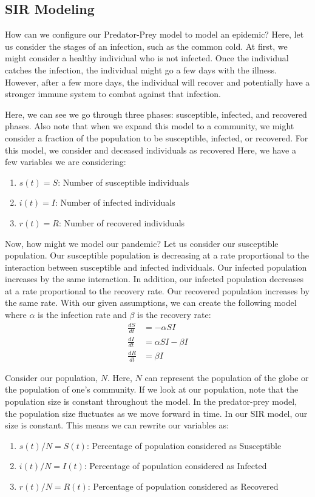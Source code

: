 \documentclass{amsart}
\theoremstyle{definition}
\numberwithin{equation}{section}
\newcommand{\dS}{\frac{dS}{dt}}
\newcommand{\dI}{\frac{dI}{dt}}
\newcommand{\dR}{\frac{dR}{dt}}
\begin{document}
\begin{sansmath}
\section{SIR Modeling}

How can we configure our Predator-Prey model to model an epidemic? Here, let us consider the stages of an infection, such as the common cold. At first, we might consider a healthy individual who is not infected. Once the individual catches the infection, the individual might go a few days with the illness. However, after a few more days, the individual will recover and potentially have a stronger immune system to combat against that infection.

Here, we can see we go through three phases: susceptible, infected, and recovered phases. Also note that when we expand this model to a community, we might consider a fraction of the population to be susceptible, infected, or recovered. For this model, we consider and deceased individuals as recovered Here, we have a few variables we are considering:

\begin{enumerate}
  \item $s(t) = S$: Number of susceptible individuals
  \item $i(t) = I$: Number of infected individuals
  \item $r(t) = R$: Number of recovered individuals
\end{enumerate}

Now, how might we model our pandemic? Let us consider our susceptible population. Our susceptible population is decreasing at a rate proportional to the interaction between susceptible and infected individuals. Our infected population increases by the same interaction. In addition, our infected population decreases at a rate proportional to the recovery rate. Our recovered population increases by the same rate. With our given assumptions, we can create the following model where $\alpha$ is the infection rate and $\beta$ is the recovery rate:
\begin{align*}
  \dS & = -\alpha SI\\
  \dI & = \alpha SI - \beta I\\
  \dR & = \beta I
\end{align*}

Consider our population, $N$. Here, $N$ can represent the population of the globe or the population of one's community. If we look at our population, note that the population size is constant throughout the model. In the predator-prey model, the population size fluctuates as we move forward in time. In our SIR model, our size is constant. This means we can rewrite our variables as:
%
\begin{enumerate}
  \item $s(t)/N = S(t)$: Percentage of population considered as Susceptible
  \item $i(t)/N = I(t)$: Percentage of population considered as Infected
  \item $r(t)/N = R(t)$: Percentage of population considered as Recovered
\end{enumerate}


\end{sansmath}
\end{document}
